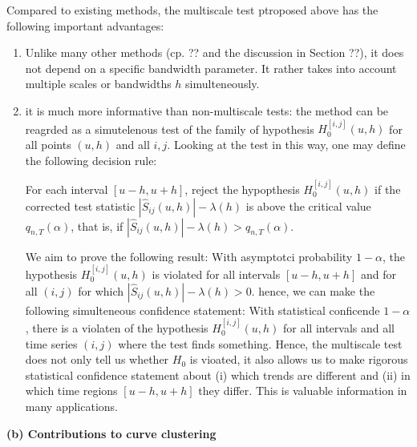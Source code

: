 \documentclass[a4paper,12pt]{article}
\begin{document}
Compared to existing methods, the multiscale test ptroposed above has the following important advantages: 
\begin{enumerate}[label=(\roman*),leftmargin=0.75cm]
\item Unlike many other methods (cp. ?? and the discussion in Section ??), it does not depend on a specific bandwidth parameter. It rather takes into account multiple scales or bandwidths $h$ simulteneously. 
\item it is much more informative than non-multiscale tests: the method can be reagrded as a simutelenous test of the family of hypothesis $H_0^{[i,j]}(u,h)$ for all points $(u,h)$ and all $i,j$. Looking at the test in this way, one may define the following decision rule: 

For each interval $[u-h,u+h]$, reject the hypopthesis $H_0^{[i,j]}(u,h)$ if the corrected test statistic $|\hat{S}_{ij}(u,h)| - \lambda(h)$ is above the critical value $q_{n,T}(\alpha)$, that is, if $|\hat{S}_{ij}(u,h)| - \lambda(h) > q_{n,T}(\alpha)$. 

We aim to prove the following result: With asymptotci probability $1-\alpha$, the hypothesis $H_0^{[i,j]}(u,h)$ is violated for all intervals $[u-h,u+h]$ and for all $(i,j)$ for which $|\hat{S}_{ij}(u,h)| - \lambda(h) > 0$. hence, we can make the following simulteneous confidence statement: With statistical conficende $1-\alpha$, there is a violaten of the hypothesis $H_0^{[i,j]}(u,h)$ for all intervals and all time series $(i,j)$ where the test finds something. Hence, the multiscale test does not only tell us whether $H_0$ is vioated, it also allows us to make rigorous statistical confidence statement about (i) which trends are different and (ii) in which time regions $[u-h,u+h]$ they differ. This is valuable information in many applications. 
\end{enumerate}
\vspace{5pt}


\noindent \textbf{(b) Contributions to curve clustering} 
\vspace{10pt} 
\end{document}
